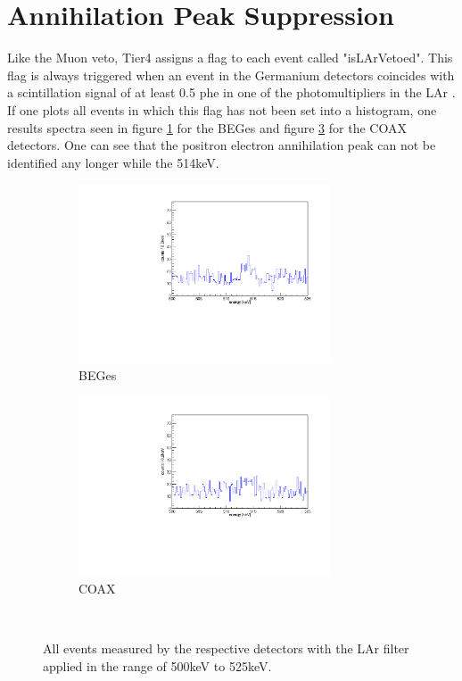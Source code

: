 \documentclass[encoding=utf8,british]{tumphthesis}
\begin{document}
\section{Annihilation Peak Suppression}
\label{sec:APS}

Like the Muon veto, Tier4 assigns a flag to each event called "isLArVetoed".
This flag is always triggered when an event in the Germanium detectors coincides with a scintillation signal of at least 0.5 phe in one of the photomultipliers in the LAr \cite{agostini_background_2017}.
If one plots all events in which this flag has not been set into a histogram, one results spectra seen in figure \ref{fig:LArBEGes} for the BEGes and figure \ref{fig:LArCOAX} for the COAX detectors.
One can see that the positron electron annihilation peak can not be identified any longer while the 514keV.
\\

\begin{figure}[t!]
\centering
\begin{subfigure}{0.5\textwidth}
	\includegraphics[width=75mm]{./Bilder/500525LArVetoBEGes.pdf}
    \caption{BEGes}
  \label{fig:LArBEGes}
\end{subfigure}%
\begin{subfigure}{0.5\textwidth}
	\includegraphics[width=75mm]{./Bilder/500525LArVetoCOAX.pdf}
  \caption{COAX}
  \label{fig:LArCOAX}
\end{subfigure}
    \\
	\vspace{0.5cm}
    \caption{All events measured by the respective detectors with the LAr filter applied in the range of 500keV to 525keV.}
\end{figure}
\end{document}
